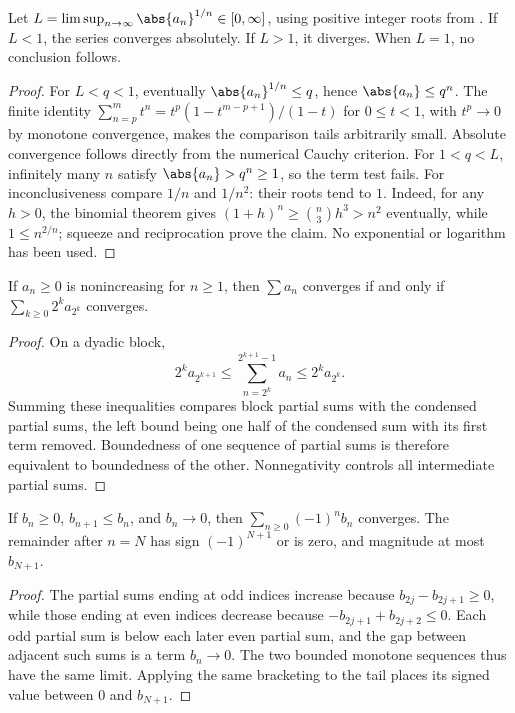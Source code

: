 \begin{theorem}
Let $L=\limsup_{n\to\infty}\abs{a_n}^{1/n}\in[0,\infty]$, using positive integer roots from . If $L<1$, the series converges absolutely. If $L>1$, it diverges. When $L=1$, no conclusion follows.
\end{theorem}
\begin{proof}
For $L<q<1$, eventually $\abs{a_n}^{1/n}\leq q$, hence $\abs{a_n}\leq q^n$. The finite identity $\sum_{n=p}^m t^n=t^p(1-t^{m-p+1})/(1-t)$ for $0\leq t<1$, with $t^p\to0$ by monotone convergence, makes the comparison tails arbitrarily small. Absolute convergence follows directly from the numerical Cauchy criterion. For $1<q<L$, infinitely many $n$ satisfy $\abs{a_n}>q^n\geq1$, so the term test fails. For inconclusiveness compare $1/n$ and $1/n^2$: their roots tend to $1$. Indeed, for any $h>0$, the binomial theorem gives $(1+h)^n\geq\binom n3 h^3>n^2$ eventually, while $1\leq n^{2/n}$; squeeze and reciprocation prove the claim. No exponential or logarithm has been used.
\end{proof}

\begin{theorem}
If $a_n\geq0$ is nonincreasing for $n\geq1$, then $\sum a_n$ converges if and only if $\sum_{k\geq0}2^k a_{2^k}$ converges.
\end{theorem}
\begin{proof}
On a dyadic block,
\[2^k a_{2^{k+1}}\leq\sum_{n=2^k}^{2^{k+1}-1}a_n\leq2^k a_{2^k}.\]
Summing these inequalities compares block partial sums with the condensed partial sums, the left bound being one half of the condensed sum with its first term removed. Boundedness of one sequence of partial sums is therefore equivalent to boundedness of the other. Nonnegativity controls all intermediate partial sums.
\end{proof}

\begin{theorem}
If $b_n\geq0$, $b_{n+1}\leq b_n$, and $b_n\to0$, then $\sum_{n\geq0}(-1)^nb_n$ converges. The remainder after $n=N$ has sign $(-1)^{N+1}$ or is zero, and magnitude at most $b_{N+1}$.
\end{theorem}
\begin{proof}
The partial sums ending at odd indices increase because $b_{2j}-b_{2j+1}\geq0$, while those ending at even indices decrease because $-b_{2j+1}+b_{2j+2}\leq0$. Each odd partial sum is below each later even partial sum, and the gap between adjacent such sums is a term $b_n\to0$. The two bounded monotone sequences thus have the same limit. Applying the same bracketing to the tail places its signed value between $0$ and $b_{N+1}$.
\end{proof}

